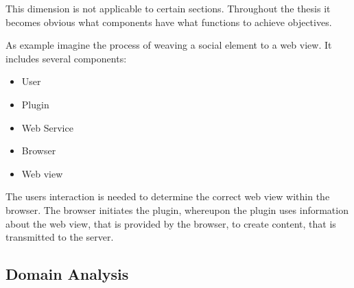 This dimension is not applicable to certain sections. Throughout the thesis it becomes obvious what components have what functions to achieve objectives. 

As example imagine the process of weaving a social element to a web view. It includes several components:
\begin{itemize}
	\item User
	\item Plugin
	\item Web Service
	\item Browser
	\item Web view
\end{itemize}

The users interaction is needed to determine the correct web view within the browser. The browser initiates the plugin, whereupon the plugin uses information about the web view, that is provided by the browser, to create content, that is transmitted to the server. 

\newpage
\subsection{Domain Analysis}\label{domainAnalysis}

